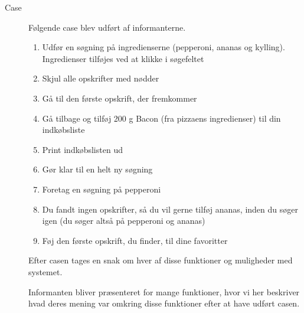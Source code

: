\begin{description}
\item[Case] Følgende case blev udført af informanterne.

\begin{enumerate}[noitemsep]
\item Udfør en søgning på ingredienserne (pepperoni, ananas og kylling). Ingredienser tilføjes ved at klikke i søgefeltet
\item Skjul alle opskrifter med nødder
\item Gå til den første opskrift, der fremkommer
\item Gå tilbage og tilføj 200 g Bacon (fra pizzaens ingredienser) til din indkøbsliste
\item Print indkøbslisten ud
\item Gør klar til en helt ny søgning
\item Foretag en søgning på pepperoni
\item Du fandt ingen opskrifter, så du vil gerne tilføj ananas, inden du søger igen (du søger altså på pepperoni og ananas)
\item Føj den første opskrift, du finder, til dine favoritter
\end{enumerate}

Efter casen tages en snak om hver af disse funktioner og muligheder med systemet.

Informanten bliver præsenteret for mange funktioner, hvor vi her beskriver hvad deres mening var omkring disse funktioner efter at have udført casen.


\end{description}
